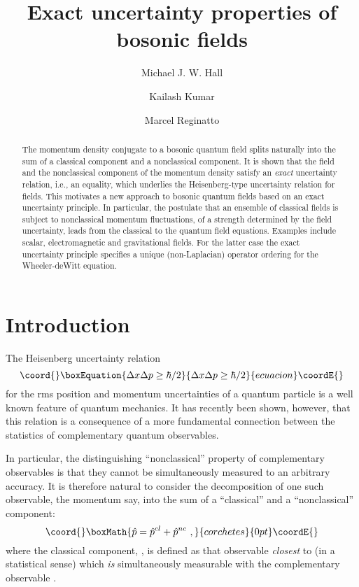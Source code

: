 \documentclass[a4paper,preprint, showpacs, aps, draft]{revtex4}
\begin{document}
\title{Exact uncertainty properties of bosonic fields}
\author{Michael J. W. Hall}
\author{Kailash Kumar}
\author{Marcel Reginatto}
\begin{abstract}
The momentum density conjugate to a bosonic quantum field splits naturally
into the sum of a classical component and a nonclassical component.  It
is shown that the field and the nonclassical component of the momentum
density satisfy an {\it exact}
uncertainty relation, i.e., an equality, which underlies 
the Heisenberg-type uncertainty relation for fields.
This motivates a new approach to bosonic 
quantum fields based on an exact uncertainty principle.  In particular,
the postulate that an ensemble of classical fields is subject to
nonclassical 
momentum fluctuations, of a strength determined by the field
uncertainty, leads from the classical to the quantum field equations.
Examples include scalar, electromagnetic and gravitational fields.  For
the latter case the exact uncertainty principle specifies a unique
(non-Laplacian) operator ordering for the Wheeler-deWitt equation. 
\end{abstract}
\maketitle

\section{Introduction}

The Heisenberg uncertainty relation
\begin{equation}\coord{}\boxEquation{ \label{hur}
\Delta x \Delta p \geq \hbar/2
}{ \Delta x \Delta p \geq \hbar/2
}{ecuacion}\coordE{}\end{equation}
for the rms position and momentum uncertainties of a quantum particle is
a well known feature of quantum mechanics. It has recently 
been shown, however, that this relation is a consequence of a more
fundamental connection between the statistics of complementary quantum
observables.

In particular, the distinguishing ``nonclassical'' 
property of complementary observables is
that they cannot be simultaneously measured to an arbitrary accuracy.
It is therefore natural to consider the decomposition of one such
observable, the momentum say, into the sum of a ``classical'' and a
``nonclassical'' component: 
\[\coord{}\boxMath{ \hat{p} = \hat{p}^{cl} + \hat{p}^{nc}~, }{corchetes}{0pt}\coordE{}\]
where the classical component, \coordHE{}, is defined as that observable
{\it closest} to \coordHE{} (in a statistical sense) which {\it is} 
simultaneously
measurable with the complementary observable \coordHE{} \cite{eur}.  
\end{document}
